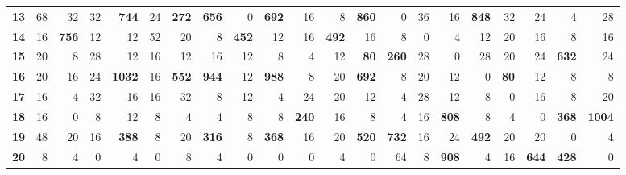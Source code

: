 \begin{table}[h]
{\begin{tabular}{c|rrrrrrrrrrrrrrrrrrrr}
\textbf{13} & 68 & 32 & 32 & \textbf{744} & 24 & \textbf{272} & \textbf{656} & 0 & \textbf{692} & 16 & 8 & \textbf{860} & 0 & 36 & 16 & \textbf{848} & 32 & 24 & 4 & 28 \\
\textbf{14} & 16 & \textbf{756} & 12 & 12 & 52 & 20 & 8 & \textbf{452} & 12 & 16 & \textbf{492} & 16 & 8 & 0 & 4 & 12 & 20 & 16 & 8 & 16 \\
\textbf{15} & 20 & 8 & 28 & 12 & 16 & 12 & 16 & 12 & 8 & 4 & 12 & \textbf{80} & \textbf{260} & 28 & 0 & 28 & 20 & 24 & \textbf{632} & 24 \\
\textbf{16} & 20 & 16 & 24 & \textbf{1032} & 16 & \textbf{552} & \textbf{944} & 12 & \textbf{988} & 8 & 20 & \textbf{692} & 8 & 20 & 12 & 0 & \textbf{80} & 12 & 8 & 8 \\
\textbf{17} & 16 & 4 & 32 & 16 & 16 & 32 & 8 & 12 & 4 & 24 & 20 & 12 & 4 & 28 & 12 & 8 & 0 & 16 & 8 & 20 \\
\textbf{18} & 16 & 0 & 8 & 12 & 8 & 4 & 4 & 8 & 8 & \textbf{240} & 16 & 8 & 4 & 16 & \textbf{808} & 8 & 4 & 0 & \textbf{368} & \textbf{1004} \\
\textbf{19} & 48 & 20 & 16 & \textbf{388} & 8 & 20 & \textbf{316} & 8 & \textbf{368} & 16 & 20 & \textbf{520} & \textbf{732} & 16 & 24 & \textbf{492} & 20 & 20 & 0 & 4 \\
\textbf{20} & 8 & 4 & 0 & 4 & 0 & 8 & 4 & 0 & 0 & 0 & 4 & 0 & 64 & 8 & \textbf{908} & 4 & 16 & \textbf{644} & \textbf{428} & 0 \\
\end{tabular}}
\end{table}
